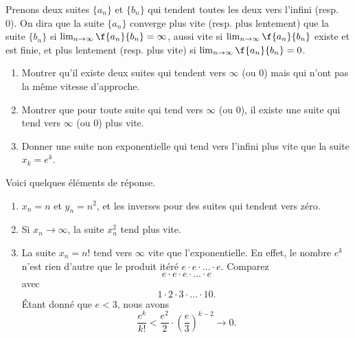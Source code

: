 \begin{example}     \label{EXooGESBooQYOCpk}
	Prenons deux suites \( \{a_n\}\) et  \( \{b_n\}\) qui tendent toutes les deux vers l'infini (resp. 0). On dira que la suite \( \{a_n\}\) converge plus vite (resp. plus lentement) que la suite \( \{b_n\}\) si \( \lim_{n\rightarrow \infty}\f{a_n}{b_n} = \infty\), aussi vite si \( \lim_{n\rightarrow \infty}\f{a_n}{b_n} \) existe et est finie, et plus lentement (resp. plus vite)  si \( \lim_{n\rightarrow \infty}\f{a_n}{b_n} = 0\).
	\begin{enumerate}
		\item Montrer qu'il existe deux suites qui tendent vers \( \infty\) (ou 0) mais qui n'ont pas la même  vitesse d'approche.
		\item Montrer que pour toute suite qui tend vers  \( \infty\) (ou 0), il existe une suite qui tend vers  \( \infty\) (ou 0) plus vite.
		\item Donner une suite non exponentielle qui tend vers l'infini plus vite que la suite \( x_k = e^k\).
	\end{enumerate}

	Voici quelques éléments de réponse.

	\begin{enumerate}
		\item \( x_n=n\) et \( y_n=n^2\), et les inverses pour des suites qui tendent vers zéro.
		\item Si \( x_n\to\infty\), la suite \( x_n^2\) tend plus vite.
		\item La suite \( x_n=n!\) tend vers \( \infty\) vite que l'exponentielle. En effet, le nombre \( e^k\) n'est rien d'autre que le produit itéré \( e\cdot e\cdot\ldots\cdot e\). Comparez
		      \begin{equation}
			      e\cdot e\cdot e\cdot\ldots\cdot e
		      \end{equation}
		      avec
		      \begin{equation}
			      1\cdot 2\cdot 3\cdot\ldots\cdot 10.
		      \end{equation}
		      Étant donné que \( e<3\), nous avons
		      \begin{equation}
			      \frac{ e^k }{ k! }<\frac{ e^2 }{ 2 }\cdot\left( \frac{ e }{ 3 } \right)^{k-2}\to 0.
		      \end{equation}

	\end{enumerate}
\end{example}

